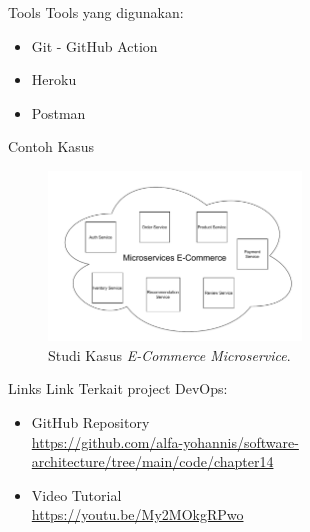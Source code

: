 \documentclass[aspectratio=169, table]{beamer}
\begin{document}
	\begin{frame}{Tools}
		Tools yang digunakan:
		\begin{itemize}
			\item Git - GitHub Action
			\item Heroku
			\item Postman
		\end{itemize}
	\end{frame}

	\begin{frame}{Contoh Kasus}
		\begin{figure}[h]
			\centering
			\includegraphics[width=0.6\textwidth]{Chapter-14-Studi-Kasus}
			\caption{Studi Kasus \textit{E-Commerce Microservice}.}
			\label{fig:client-server-schema}
		\end{figure}

		\end{frame}

	\begin{frame}{Links}
		Link Terkait project DevOps:
		\begin{itemize}
			\item GitHub Repository
			\\ \url{https://github.com/alfa-yohannis/software-architecture/tree/main/code/chapter14}
			\item Video Tutorial
			\\\url{https://youtu.be/My2MOkgRPwo}
		\end{itemize}
	\end{frame}
\end{document}
